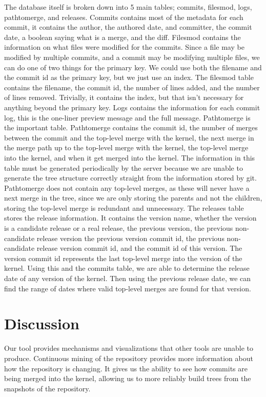 \documentclass[conference, draftclsnofoot]{IEEEtran}
\begin{document}
The database itself is broken down into 5 main tables; commits, filesmod, logs,
pathtomerge, and releases. Commits contains most of the metadata for each commit, it
contains the author, the authored date, and committer, the commit date, a boolean
saying what is a merge, and the diff. Filesmod contains the information on what
files were modified for the commits. Since a file may be modified by multiple
commits, and a commit may be modifying multiple files, we can do one of two things
for the primary key. We could use both the filename and the commit id as the primary
key, but we just use an index. The filesmod table contains the filename, the commit
id, the number of lines added, and the number of lines removed. Trivially, it
contains the index, but that isn't necessary for anything beyond the primary key.
Logs contains the information for each commit log, this is the one-liner preview
message and the full message. Pathtomerge is the important table. Pathtomerge
contains the commit id, the number of merges between the commit and the top-level
merge with the kernel, the next merge in the merge path up to the top-level merge
with the kernel, the top-level merge into the kernel, and when it get merged into
the kernel. The information in this table must be generated periodically by the
server because we are unable to generate the tree structure correctly straight from
the information stored by git. Pathtomerge does not contain any top-level merges, as
these will never have a next merge in the tree, since we are only storing the
parents and not the children, storing the top-level merge is redundant and
unnecessary. The releases table stores the release information.  It contains the
version name, whether the version is a candidate release or a real release, the
previous version, the previous non-candidate release version the previous version
commit id, the previous non-candidate release version commit id, and the commit id
of this version. The version commit id represents the last top-level merge into the
version of the kernel. Using this and the commits table, we are able to determine
the release date of any version of the kernel. Then using the previous release date,
we can find the range of dates where valid top-level merges are found for that
version.

\section{Discussion}

Our tool provides mechanisms and visualizations that other tools are unable to
produce. Continuous mining of the repository\cite{German} provides more information
about how the repository is changing. It gives us the ability to see how commits are
being merged into the kernel, allowing us to more reliably build trees from the
snapshots of the repository.
\end{document}
